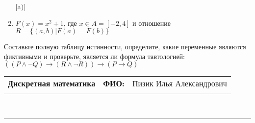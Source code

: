 \documentclass[10pt]{exam}
\newcommand{\class}{Дискретная математика}
\newcommand{\examdate}{}
\begin{document}
\begin{questions}
\begin{enumerate} [a)]
\item $F(x)=x^{2}+1$, где $x \in A = [-2, 4]$ и отношение $R = \{(a,b)|F(a) = F(b)\}$
\end{enumerate}\question Составьте полную таблицу истинности, определите, какие переменные являются фиктивными и проверьте, является ли формула тавтологией:
$(( P \land \neg Q) \rightarrow (R \land \neg R)) \rightarrow (P \rightarrow Q)$

\end{questions}
\newpage
\begin{flushright}
\begin{tabular}{p{2.8in} r l}
\textbf{\class} & \textbf{ФИО:} &Пизик Илья Александрович
\\

\textbf{\examdate} &&\\
\end{tabular}\\
\end{flushright}
\rule[1ex]{\textwidth}{.1pt}
\end{document}
